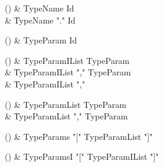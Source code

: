 \begin{bbgrammarappendix}{4.2in}

() & TypeName \label{prod:TypeName}  \: Id  \\

 &    \| TypeName \xcd"." Id \\

\end{bbgrammarappendix}

\begin{bbgrammarappendix}{4.1in}

() & TypeParam \label{prod:TypeParam}  \: Id  \\


\end{bbgrammarappendix}

\begin{bbgrammarappendix}{3.6in}

() & TypeParamIList \label{prod:TypeParamIList}  \: TypeParam  \\

 &    \| TypeParamIList \xcd"," TypeParam \\
 &    \| TypeParamIList \xcd"," \\

\end{bbgrammarappendix}

\begin{bbgrammarappendix}{3.7in}

() & TypeParamList \label{prod:TypeParamList}  \: TypeParam  \\

 &    \| TypeParamList \xcd"," TypeParam \\

\end{bbgrammarappendix}

\begin{bbgrammarappendix}{4.0in}

() & TypeParams \label{prod:TypeParams}  \: \xcd"[" TypeParamList \xcd"]"  \\


\end{bbgrammarappendix}

\begin{bbgrammarappendix}{3.9in}

() & TypeParamsI \label{prod:TypeParamsI}  \: \xcd"[" TypeParamIList \xcd"]"  \\


\end{bbgrammarappendix}

